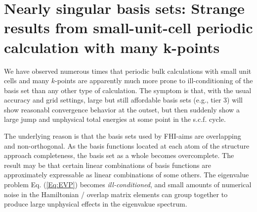 \section{Nearly singular basis sets: Strange results from small-unit-cell periodic calculation with many k-points}

We have observed numerous times that periodic bulk calculations with
small unit cells and many $k$-points are apparently much more prone to
ill-conditioning of the basis set than any other type of
calculation. The symptom is that, with the usual accuracy and grid
settings, large but still affordable basis sets (e.g., tier 3) will
show reasonabl convergence behavior at the outset, but then suddenly
show a large jump and unphysical total energies at some point in the
s.c.f. cycle. 

The underlying reason is that the basis sets used by FHI-aims are
overlapping and non-orthogonal. As the basis functions located at each
atom of the structure approach completeness, the basis set as a whole
becomes overcomplete. The result may be that certain linear
combinations of basis functions are approximately expressable as
linear combinations of some others. The eigenvalue problem
Eq. (\ref{Eq:EVP}) becomes \emph{ill-conditioned}, and small amounts of
numerical noise in the Hamiltonian / overlap matrix elements can
group together to produce large unphysical effects in the eigenvakue
spectrum. 

